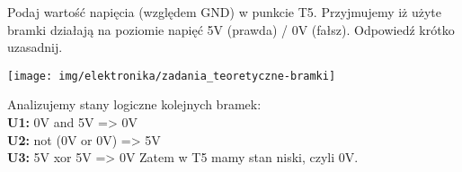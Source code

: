% 
% 
% 
% 



%
%

\dbEntryCheckResults
Podaj wartość napięcia (względem GND) w punkcie T5. Przyjmujemy iż użyte bramki działają na poziomie napięć 5V (prawda) / 0V (fałsz). Odpowiedź krótko uzasadnij.
	\begin{center}
		\texttt{[image: img/elektronika/zadania\_teoretyczne-bramki]}
	\end{center}
\fi
{}\dbEntryCheckResults
Analizujemy stany logiczne kolejnych bramek:\\
	\textbf{U1:} 0V and 5V => 0V\\
	\textbf{U2:} not (0V or 0V) => 5V\\
	\textbf{U3:} 5V xor 5V => 0V
Zatem w T5 mamy stan niski, czyli 0V.
\fi

